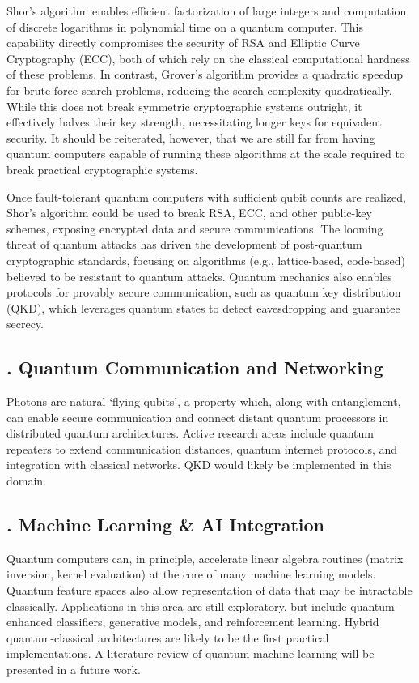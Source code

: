 \documentclass{elbioimp2}
\begin{document}
Shor’s algorithm enables efficient factorization of large integers and computation of discrete logarithms in polynomial time on a quantum computer. This capability directly compromises the security of RSA and Elliptic Curve Cryptography (ECC), both of which rely on the classical computational hardness of these problems. In contrast, Grover’s algorithm provides a quadratic speedup for brute-force search problems, reducing the search complexity quadratically. While this does not break symmetric cryptographic systems outright, it effectively halves their key strength, necessitating longer keys for equivalent security. It should be reiterated, however, that we are still far from having quantum computers capable of running these algorithms at the scale required to break practical cryptographic systems.

Once fault-tolerant quantum computers with sufficient qubit counts are realized, Shor’s algorithm could be used to break RSA, ECC, and other public-key schemes, exposing encrypted data and secure communications. The looming threat of quantum attacks has driven the development of post-quantum cryptographic standards, focusing on algorithms (e.g., lattice-based, code-based) believed to be resistant to quantum attacks. Quantum mechanics also enables protocols for provably secure communication, such as quantum key distribution (QKD), which leverages quantum states to detect eavesdropping and guarantee secrecy.

\subsection{. Quantum Communication and Networking}

Photons are natural `flying qubits', a property which, along with entanglement, can enable secure communication and connect distant quantum processors in distributed quantum architectures. Active research areas include quantum repeaters to extend communication distances, quantum internet protocols, and integration with classical networks. QKD would likely be implemented in this domain.

\subsection{. Machine Learning \& AI Integration}

Quantum computers can, in principle, accelerate linear algebra routines (matrix inversion, kernel evaluation) at the core of many machine learning models. Quantum feature spaces also allow representation of data that may be intractable classically. Applications in this area are still exploratory, but include quantum-enhanced classifiers, generative models, and reinforcement learning. Hybrid quantum-classical architectures are likely to be the first practical implementations. A literature review of quantum machine learning will be presented in a future work.
\end{document}
